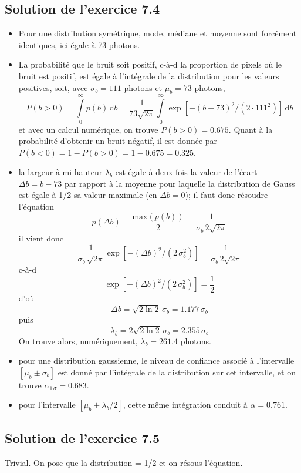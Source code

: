 \subsection*{Solution de l'exercice 7.4}

\begin{itemize}
\item Pour une distribution symétrique, mode, médiane et moyenne sont forcément identiques, ici égale à 73 photons.
\item La probabilité que le bruit soit positif, c-à-d la proportion de pixels où le bruit est positif, est égale à l'intégrale de la distribution pour les valeurs positives, soit, avec $\sigma_b=111$ photons et $\mu_b=73$ photons,
$$
P(b>0)=\int\limits_{0}^{\infty}p(b)\,\text{d}b=\frac{1}{73\sqrt{2\pi}}
\int\limits_{0}^{\infty}\exp{\left[-(b-73)^2/(2\cdot111^2)\right]}\,\text{d}b
$$
et avec un calcul numérique, on trouve $P(b>0)=0.675$. Quant à la probabilité d'obtenir un bruit négatif, il est donnée par $P(b<0)=1-P(b>0)=1-0.675=0.325$.
\item la largeur à mi-hauteur $\lambda_b$ est égale à deux fois la valeur de l'écart $\Delta b=b-73$ par rapport à la moyenne pour laquelle la distribution de Gauss est égale à 1/2 sa valeur maximale (en $\Delta b=0$); il faut donc résoudre l'équation
$$
p(\Delta b)=\frac{\text{max}(p(b))}{2}=\frac{1}{\sigma_b\,2\sqrt{2\pi}}
$$
il vient donc
$$
\frac{1}{\sigma_b\,\sqrt{2\pi}}\exp{\left[-(\Delta b)^2/(2\,\sigma_b^2)\right]}=\frac{1}{\sigma_b\,2\sqrt{2\pi}}
$$
c-à-d
$$
\exp{\left[-(\Delta b)^2/(2\,\sigma_b^2)\right]}=\frac{1}{2}
$$
d'où
$$
\Delta b=\sqrt{2\ln{2}}\,\sigma_b=1.177\,\sigma_b
$$
puis
$$
\lambda_b=2\sqrt{2\ln{2}}\,\sigma_b=2.355\,\sigma_b
$$
On trouve alors, numériquement, $\lambda_b=261.4$ photons.
\item pour une distribution gaussienne, le niveau de confiance associé à l'intervalle $[\mu_b\pm\sigma_b]$ est donné par l'intégrale de la distribution sur cet intervalle, et on trouve $\alpha_{1\,\sigma}=0.683$.
\item pour l'intervalle $[\mu_b\pm\lambda_b/2]$, cette même intégration conduit à $\alpha=0.761$.
\end{itemize}

\subsection*{Solution de l'exercice 7.5}

Trivial. On pose que la distribution = 1/2 et on résous l'équation.

